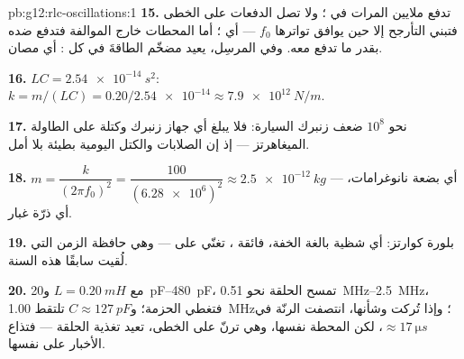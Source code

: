 \begin{solution}{pb:g12:rlc-oscillations:1}
\textbf{15.} تدفع  ملايين المرات في ؛ ولا تصل الدفعات على الخطى
فتبني التأرجح إلا حين يوافق تواترها $f_0$ --- أي ؛
أما المحطات خارج الموالفة فتدفع ضده بقدر ما تدفع معه.
وفي المرسِل، يعيد مضخّم الطاقةَ 
في كل : أي  مصان.

\textbf{16.} $LC = \qty{2.54e-14}{s^2}$: $k = m/(LC) =
0.20/\num{2.54e-14} \approx \qty{7.9e12}{N/m}$.

\textbf{17.} نحو $10^8$ ضعف زنبرك السيارة: فلا يبلغ أي جهاز
زنبرك وكتلة على الطاولة الميغاهرتز --- إذ إن الصلابات والكتل اليومية
بطيئة بلا أمل.

\textbf{18.} $m = \dfrac{k}{(2\pi f_0)^2} = \dfrac{100}
{(\num{6.28e6})^2} \approx \qty{2.5e-12}{kg}$ --- أي بضعة نانوغرامات، أي
ذرّة غبار.

\textbf{19.} بلورة كوارتز: أي شظية بالغة الخفة، فائقة ،
تغنّي على  --- وهي حافظة الزمن التي لُقيت سابقًا هذه
السنة.

\textbf{20.} مع $L = \qty{0.20}{mH}$ و\qtyrange{20}{480}{pF}، تمسح
الحلقة نحو \qtyrange{0.51}{2.5}{MHz}، فتغطي الحزمة؛
و$C \approx \qty{127}{pF}$ تلتقط \qty{1.00}{MHz}؛ وإذا تُركت وشأنها، انتصفت الرنّة
في $\approx \qty{17}{\micro s}$، لكن  المحطة نفسها،
وهي ترنّ على الخطى، تعيد تغذية الحلقة --- فتذاع الأخبار على 
 نفسها.
\end{solution}
